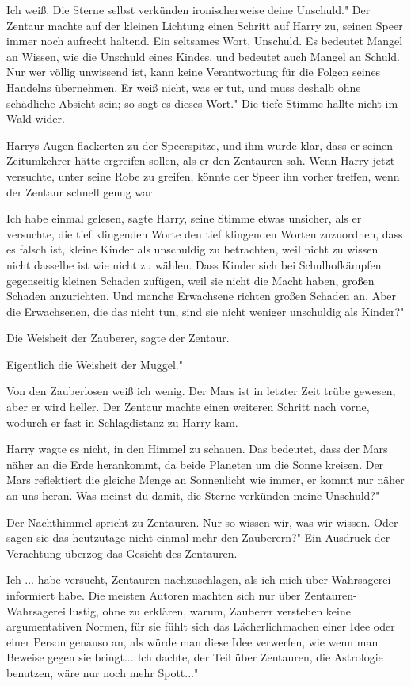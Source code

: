 \glqq{}Ich weiß. Die Sterne selbst verkünden ironischerweise deine Unschuld." Der
Zentaur machte auf der kleinen Lichtung einen Schritt auf Harry zu, seinen Speer
immer noch aufrecht haltend. \glqq{}Ein seltsames Wort, Unschuld. Es bedeutet
Mangel an Wissen, wie die Unschuld eines Kindes, und bedeutet auch Mangel an
Schuld. Nur wer völlig unwissend ist, kann keine Verantwortung für die Folgen
seines Handelns übernehmen. Er weiß nicht, was er tut, und muss deshalb ohne
schädliche Absicht sein; so sagt es dieses Wort." Die tiefe Stimme hallte nicht
im Wald wider.

Harrys Augen flackerten zu der Speerspitze, und ihm wurde klar, dass er seinen
Zeitumkehrer hätte ergreifen sollen, als er den Zentauren sah. Wenn Harry jetzt
versuchte, unter seine Robe zu greifen, könnte der Speer ihn vorher treffen,
wenn der Zentaur schnell genug war.

\glqq{}Ich habe einmal gelesen\grqq{}, sagte Harry, seine Stimme etwas unsicher,
als er versuchte, die tief klingenden Worte den tief klingenden Worten
zuzuordnen, \glqq{}dass es falsch ist, kleine Kinder als unschuldig zu
betrachten, weil nicht zu wissen nicht dasselbe ist wie nicht zu wählen. Dass
Kinder sich bei Schulhofkämpfen gegenseitig kleinen Schaden zufügen, weil sie
nicht die Macht haben, großen Schaden anzurichten. Und manche Erwachsene richten
großen Schaden an. Aber die Erwachsenen, die das nicht tun, sind sie nicht
weniger unschuldig als Kinder?"

\glqq{}Die Weisheit der Zauberer\grqq{}, sagte der Zentaur.

\glqq{}Eigentlich die Weisheit der Muggel."

\glqq{}Von den Zauberlosen weiß ich wenig. Der Mars ist in letzter Zeit trübe
gewesen, aber er wird heller.\grqq{} Der Zentaur machte einen weiteren Schritt
nach vorne, wodurch er fast in Schlagdistanz zu Harry kam.

Harry wagte es nicht, in den Himmel zu schauen. \glqq{}Das bedeutet, dass der
Mars näher an die Erde herankommt, da beide Planeten um die Sonne kreisen. Der
Mars reflektiert die gleiche Menge an Sonnenlicht wie immer, er kommt nur näher
an uns heran. Was meinst du damit, die Sterne verkünden meine Unschuld?"

\glqq{}Der Nachthimmel spricht zu Zentauren. Nur so wissen wir, was wir wissen.
Oder sagen sie das heutzutage nicht einmal mehr den Zauberern?" Ein Ausdruck der
Verachtung überzog das Gesicht des Zentauren.

\glqq{}Ich ... habe versucht, Zentauren nachzuschlagen, als ich mich über
Wahrsagerei informiert habe. Die meisten Autoren machten sich nur über
Zentauren-Wahrsagerei lustig, ohne zu erklären, warum, Zauberer verstehen keine
argumentativen Normen, für sie fühlt sich das Lächerlichmachen einer Idee oder
einer Person genauso an, als würde man diese Idee verwerfen, wie wenn man
Beweise gegen sie bringt... Ich dachte, der Teil über Zentauren, die Astrologie
benutzen, wäre nur noch mehr Spott..."

